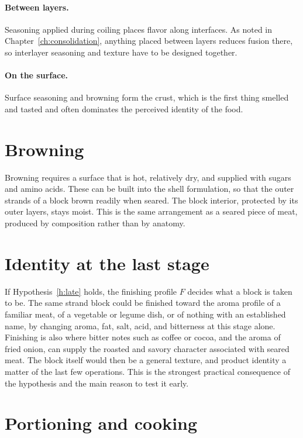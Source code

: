 \documentclass[11pt,openany]{book}
\theoremstyle{definition}
\begin{document}
\paragraph{Between layers.} Seasoning applied during coiling places flavor along interfaces. As noted in Chapter~\ref{ch:consolidation}, anything placed between layers reduces fusion there, so interlayer seasoning and texture have to be designed together.

\paragraph{On the surface.} Surface seasoning and browning form the crust, which is the first thing smelled and tasted and often dominates the perceived identity of the food.

\section{Browning}

Browning requires a surface that is hot, relatively dry, and supplied with sugars and amino acids. These can be built into the shell formulation, so that the outer strands of a block brown readily when seared. The block interior, protected by its outer layers, stays moist. This is the same arrangement as a seared piece of meat, produced by composition rather than by anatomy.

\section{Identity at the last stage}

If Hypothesis~\ref{h:late} holds, the finishing profile $F$ decides what a block is taken to be. The same strand block could be finished toward the aroma profile of a familiar meat, of a vegetable or legume dish, or of nothing with an established name, by changing aroma, fat, salt, acid, and bitterness at this stage alone. Finishing is also where bitter notes such as coffee or cocoa, and the aroma of fried onion, can supply the roasted and savory character associated with seared meat. The block itself would then be a general texture, and product identity a matter of the last few operations. This is the strongest practical consequence of the hypothesis and the main reason to test it early.

\section{Portioning and cooking}
\end{document}
